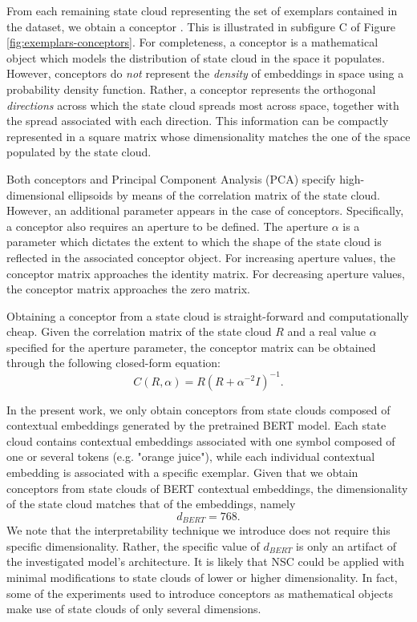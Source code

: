 From each remaining state cloud representing the set of exemplars contained in the dataset, we obtain a conceptor \citep{jaeger_controlling_2017}. This is illustrated in subfigure C of Figure \ref{fig:exemplars-conceptors}. For completeness, a conceptor is a mathematical object which models the distribution of state cloud in the space it populates. However, conceptors do \textit{not} represent the \textit{density} of embeddings in space using a probability density function. Rather, a conceptor represents the orthogonal \textit{directions} across which the state cloud spreads most across space, together with the spread associated with each direction. This information can be compactly represented in a square matrix whose dimensionality matches the one of the space populated by the state cloud.

Both conceptors and Principal Component Analysis (PCA) specify high-dimensional ellipsoids by means of the correlation matrix of the state cloud. However, an additional parameter appears in the case of conceptors. Specifically, a conceptor also requires an aperture to be defined. The aperture $\alpha$ is a parameter which dictates the extent to which the shape of the state cloud is reflected in the associated conceptor object. For increasing aperture values, the conceptor matrix approaches the identity matrix. For decreasing aperture values, the conceptor matrix approaches the zero matrix.

Obtaining a conceptor from a state cloud is straight-forward and computationally cheap. Given the correlation matrix of the state cloud $R$ and a real value $\alpha$ specified for the aperture parameter, the conceptor matrix can be obtained through the following closed-form equation:$$C(R, \alpha) = R (R + \alpha^{-2} I)^{-1}.$$

In the present work, we only obtain conceptors from state clouds composed of contextual embeddings generated by the pretrained BERT model. Each state cloud contains contextual embeddings associated with one symbol composed of one or several tokens (e.g. "orange juice"), while each individual contextual embedding is associated with a specific exemplar. Given that we obtain conceptors from state clouds of BERT contextual embeddings, the dimensionality of the state cloud matches that of the embeddings, namely $$d_{BERT}=768.$$ We note that the interpretability technique we introduce does not require this specific dimensionality. Rather, the specific value of $d_{BERT}$ is only an artifact of the investigated model's architecture. It is likely that NSC could be applied with minimal modifications to state clouds of lower or higher dimensionality. In fact, some of the experiments used to introduce conceptors as mathematical objects make use of state clouds of only several dimensions.

